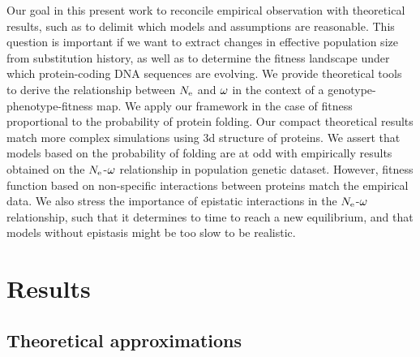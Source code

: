 \documentclass{article}
\begin{document}
Our goal in this present work to reconcile empirical observation with theoretical results, such as to delimit which models and assumptions are reasonable.
This question is important if we want to extract changes in effective population size from substitution history, as well as to determine the fitness landscape under which protein-coding DNA sequences are evolving.
We provide theoretical tools to derive the relationship between $N_{\mathrm{e}}$ and $\omega$ in the context of a genotype-phenotype-fitness map.
We apply our framework in the case of fitness proportional to the probability of protein folding.
Our compact theoretical results match more complex simulations using 3d structure of proteins.
We assert that models based on the probability of folding are at odd with empirically results obtained on the $N_{\mathrm{e}}$-$\omega$ relationship in population genetic dataset.
However, fitness function based on non-specific interactions between proteins match the empirical data.
We also stress the importance of epistatic interactions in the $N_{\mathrm{e}}$-$\omega$ relationship, such that it determines to time to reach a new equilibrium, and that models without epistasis might be too slow to be realistic.

\section*{Results}
\subsection*{Theoretical approximations}
\end{document}
